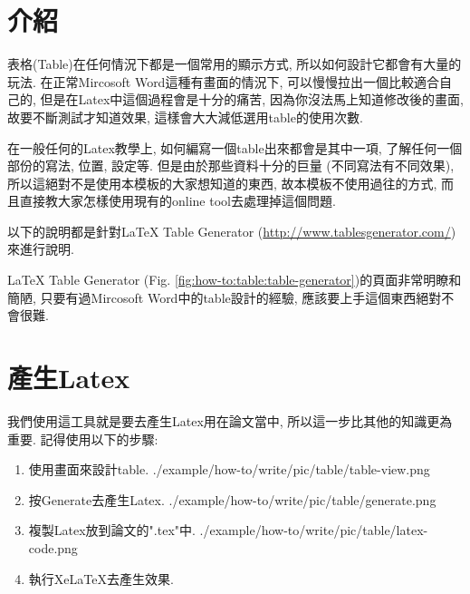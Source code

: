 \section{介紹}

表格(Table)在任何情況下都是一個常用的顯示方式, 所以如何設計它都會有大量的玩法. 在正常Mircosoft Word這種有畫面的情況下, 可以慢慢拉出一個比較適合自己的, 但是在Latex中這個過程會是十分的痛苦, 因為你沒法馬上知道修改後的畫面, 故要不斷測試才知道效果, 這樣會大大減低選用table的使用次數.

在一般任何的Latex教學上, 如何編寫一個table出來都會是其中一項, 了解任何一個部份的寫法, 位置, 設定等. 但是由於那些資料十分的巨量 (不同寫法有不同效果), 所以這絕對不是使用本模板的大家想知道的東西, 故本模板不使用過往的方式, 而且直接教大家怎樣使用現有的online tool去處理掉這個問題.

以下的說明都是針對LaTeX Table Generator (\url{http://www.tablesgenerator.com/})\cite{web:latex:table-generator}來進行說明.

LaTeX Table Generator (Fig. \ref{fig:how-to:table:table-generator})的頁面非常明瞭和簡陋, 只要有過Mircosoft Word中的table設計的經驗, 應該要上手這個東西絕對不會很難.

\newpage
{}

\newpage
\section{產生Latex}

  我們使用這工具就是要去產生Latex用在論文當中, 所以這一步比其他的知識更為重要. 記得使用以下的步驟:

  \begin{enumerate}
    \item
    {
      使用畫面來設計table.
      \InsertCenterImage
        {./example/how-to/write/pic/table/table-view.png}
    } %

    \item
    {
      按Generate去產生Latex.
      \InsertCenterImage
        {./example/how-to/write/pic/table/generate.png}
    } %

    \item
    {
      複製Latex放到論文的".tex"中.
      \InsertCenterImage
        {./example/how-to/write/pic/table/latex-code.png}
    } %

    \item
    {
      執行XeLaTeX去產生效果.
    } %
  \end{enumerate}

